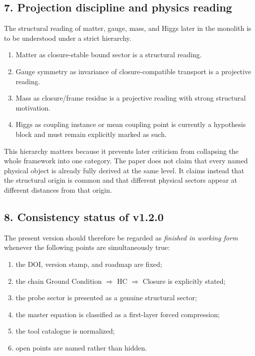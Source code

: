 \subsection*{7. Projection discipline and physics reading}
The structural reading of matter, gauge, mass, and Higgs later in the monolith
is to be understood under a strict hierarchy.
\begin{enumerate}[leftmargin=2em]
  \item Matter as closure-stable bound sector is a structural reading.
  \item Gauge symmetry as invariance of closure-compatible transport is a
  projective reading.
  \item Mass as closure/frame residue is a projective reading with strong
  structural motivation.
  \item Higgs as coupling instance or mean coupling point is currently a
  hypothesis block and must remain explicitly marked as such.
\end{enumerate}

This hierarchy matters because it prevents later criticism from collapsing the
whole framework into one category. The paper does not claim that every named
physical object is already fully derived at the same level. It claims instead
that the structural origin is common and that different physical sectors appear
at different distances from that origin.

\subsection*{8. Consistency status of v1.2.0}
The present version should therefore be regarded as \emph{finished in working
form} whenever the following points are simultaneously true:
\begin{enumerate}[leftmargin=2em]
  \item the DOI, version stamp, and roadmap are fixed;
  \item the chain Ground Condition $\Rightarrow$ HC $\Rightarrow$ Closure is
  explicitly stated;
  \item the probe sector is presented as a genuine structural sector;
  \item the master equation is classified as a first-layer forced compression;
  \item the tool catalogue is normalized;
  \item open points are named rather than hidden.
\end{enumerate}

